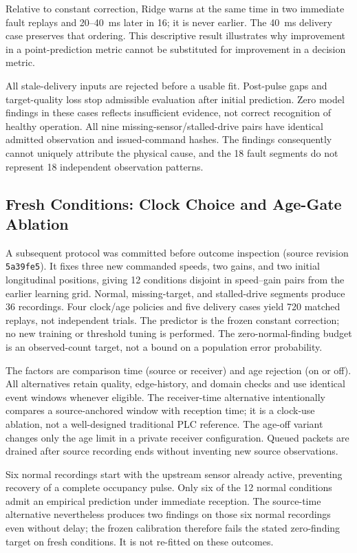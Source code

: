 Relative to constant correction, Ridge warns at the same time in two immediate fault replays and 20--40~ms later in 16; it is never earlier. The 40~ms delivery case preserves that ordering. This descriptive result illustrates why improvement in a point-prediction metric cannot be substituted for improvement in a decision metric.

All stale-delivery inputs are rejected before a usable fit. Post-pulse gaps and target-quality loss stop admissible evaluation after initial prediction. Zero model findings in these cases reflects insufficient evidence, not correct recognition of healthy operation. All nine missing-sensor/stalled-drive pairs have identical admitted observation and issued-command hashes. The findings consequently cannot uniquely attribute the physical cause, and the 18 fault segments do not represent 18 independent observation patterns.

\subsection{Fresh Conditions: Clock Choice and Age-Gate Ablation}
A subsequent protocol was committed before outcome inspection (source revision \texttt{5a39fe5}). It fixes three new commanded speeds, two gains, and two initial longitudinal positions, giving 12 conditions disjoint in speed--gain pairs from the earlier learning grid. Normal, missing-target, and stalled-drive segments produce 36 recordings. Four clock/age policies and five delivery cases yield 720 matched replays, not independent trials. The predictor is the frozen constant correction; no new training or threshold tuning is performed. The zero-normal-finding budget is an observed-count target, not a bound on a population error probability.

The factors are comparison time (source or receiver) and age rejection (on or off). All alternatives retain quality, edge-history, and domain checks and use identical event windows whenever eligible. The receiver-time alternative intentionally compares a source-anchored window with reception time; it is a clock-use ablation, not a well-designed traditional PLC reference. The age-off variant changes only the age limit in a private receiver configuration. Queued packets are drained after source recording ends without inventing new source observations.


Six normal recordings start with the upstream sensor already active, preventing recovery of a complete occupancy pulse. Only six of the 12 normal conditions admit an empirical prediction under immediate reception. The source-time alternative nevertheless produces two findings on those six normal recordings even without delay; the frozen calibration therefore fails the stated zero-finding target on fresh conditions. It is not re-fitted on these outcomes.

